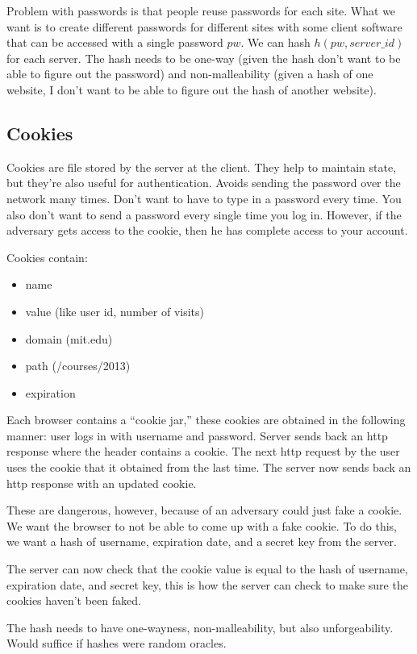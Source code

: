 \documentclass[psamsfonts]{amsart}
\begin{document}
Problem with passwords is that people reuse passwords for each site. What we want is to create different passwords for different sites with some client software that can be accessed with a single password $pw$. We can hash $h(pw, server\_id)$ for each server. The hash needs to be one-way (given the hash don't want to be able to figure out the password) and non-malleability (given a hash of one website, I don't want to be able to figure out the hash of another website).

\subsection{Cookies}

Cookies are file stored by the server at the client. They help to maintain state, but they're also useful for authentication. Avoids sending the password over the network many times. Don't want to have to type in a password every time. You also don't want to send a password every single time you log in. However, if the adversary gets access to the cookie, then he has complete access to your account.

Cookies contain:
\begin{itemize}
  \item name
  \item value (like user id, number of visits)
  \item domain (mit.edu)
  \item path (/courses/2013)
  \item expiration
\end{itemize}

Each browser contains a ``cookie jar,'' these cookies are obtained in the following manner: user logs in with username and password. Server sends back an http response where the header contains a cookie. The next http request by the user uses the cookie that it obtained from the last time. The server now sends back an http response with an updated cookie.

These are dangerous, however, because of an adversary could just fake a cookie. We want the browser to not be able to come up with a fake cookie. To do this, we want a hash of username, expiration date, and a secret key from the server.

The server can now check that the cookie value is equal to the hash of username, expiration date, and secret key, this is how the server can check to make sure the cookies haven't been faked.

The hash needs to have one-wayness, non-malleability, but also unforgeability. Would suffice if hashes were random oracles.
\end{document}
